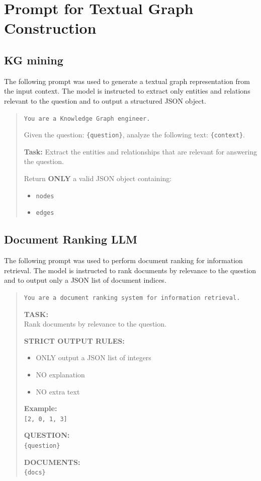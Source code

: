\documentclass[11pt]{article}
\begin{document}




\appendix

\section{Prompt for Textual Graph Construction}


\subsection{KG mining}
\label{appendix:KGM}
The following prompt was used to generate a textual graph representation from the input context. The model is instructed to extract only entities and relations relevant to the question and to output a structured JSON object.

\begin{quote}
\small
\texttt{You are a Knowledge Graph engineer.}

Given the question: \texttt{\{question\}}, analyze the following text: \texttt{\{context\}}.

\textbf{Task:} Extract the entities and relationships that are relevant for answering the question.

Return \textbf{ONLY} a valid JSON object containing:
\begin{itemize}
    \item \texttt{nodes}
    \item \texttt{edges}
\end{itemize}
\normalsize
\end{quote}


\subsection{Document Ranking LLM}

The following prompt was used to perform document ranking for information retrieval. The model is instructed to rank documents by relevance to the question and to output only a JSON list of document indices.

\begin{quote}
\small
\texttt{You are a document ranking system for information retrieval.}

\textbf{TASK:} \\
Rank documents by relevance to the question.

\textbf{STRICT OUTPUT RULES:}
\begin{itemize}
    \item ONLY output a JSON list of integers
    \item NO explanation
    \item NO extra text
\end{itemize}

\textbf{Example:} \\
\texttt{[2, 0, 1, 3]}

\textbf{QUESTION:} \\
\texttt{\{question\}}

\textbf{DOCUMENTS:} \\
\texttt{\{docs\}}
\normalsize
\end{quote}
\end{document}
